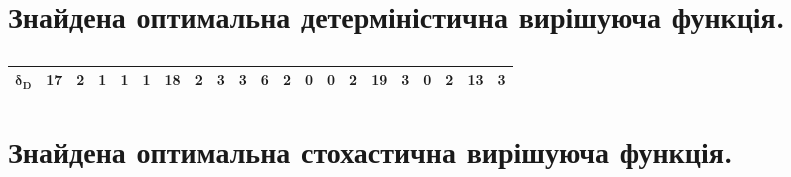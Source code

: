 \documentclass[a4paper,12pt]{article}
\begin{document}
\section{Знайдена оптимальна детерміністична вирішуюча функція.}

\begin{table}[H]
    \centering
    \begin{adjustbox}{scale=1.4,center}
    \begin{tabular}{|*{21}{c|}}
    \hline
        $\mathbf{\delta_D}$ & 17 & 2 & 1 & 1 & 1 & 18 & 2 & 3 & 3 & 6 & 2 & 0 & 0 & 2 & 19 & 3 & 0 & 2 & 13 & 3 \\ \hline
    \end{tabular}
\end{adjustbox}
    \caption{}
    \label{Tab4}
\end{table}

\section{Знайдена оптимальна стохастична вирішуюча функція.}
\end{document}
